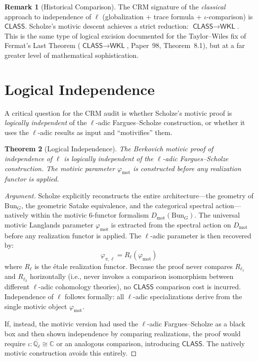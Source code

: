 \documentclass[11pt,a4paper]{article}
\theoremstyle{plain}
\newtheorem{theorem}{Theorem}[section]
\theoremstyle{definition}
\newtheorem{remark}[theorem]{Remark}
\newcommand{\WKL}{\textsf{WKL}}
\newcommand{\CLASS}{\textsf{CLASS}}
\newcommand{\Dmot}{D_{\mathrm{mot}}}
\newcommand{\Bun}{\mathrm{Bun}}
\newcommand{\Q}{\mathbb{Q}}
\newcommand{\C}{\mathbb{C}}
\begin{document}
\begin{remark}[Historical Comparison]
The CRM signature of the \emph{classical} approach to independence of $\ell$ (globalization + trace formula + $\iota$-comparison) is $\CLASS$. Scholze's motivic descent achieves a strict reduction: $\CLASS \to \WKL$. This is the same type of logical excision documented for the Taylor--Wiles fix of Fermat's Last Theorem ($\CLASS \to \WKL$, Paper~98, Theorem~8.1), but at a far greater level of mathematical sophistication.
\end{remark}


\section{Logical Independence}\label{sec:independence}

A critical question for the CRM audit is whether Scholze's motivic proof is \emph{logically independent} of the $\ell$-adic Fargues--Scholze construction, or whether it uses the $\ell$-adic results as input and ``motivifies'' them.

\begin{theorem}[Logical Independence]\label{thm:logical-independence}
The Berkovich motivic proof of independence of $\ell$ is logically independent of the $\ell$-adic Fargues--Scholze construction. The motivic parameter $\varphi_{\mathrm{mot}}$ is constructed before any realization functor is applied.
\end{theorem}

\begin{proof}[Argument]
Scholze explicitly reconstructs the entire architecture---the geometry of $\Bun_G$, the geometric Satake equivalence, and the categorical spectral action---natively within the motivic 6-functor formalism $\Dmot(\Bun_G)$. The universal motivic Langlands parameter $\varphi_{\mathrm{mot}}$ is extracted from the spectral action on $\Dmot$ before any realization functor is applied. The $\ell$-adic parameter is then recovered by:
\[
\varphi_{\pi, \ell} = R_\ell(\varphi_{\mathrm{mot}})
\]
where $R_\ell$ is the \'etale realization functor. Because the proof never compares $R_{\ell_1}$ and $R_{\ell_2}$ horizontally (i.e., never invokes a comparison isomorphism between different $\ell$-adic cohomology theories), no $\CLASS$ comparison cost is incurred. Independence of $\ell$ follows formally: all $\ell$-adic specializations derive from the single motivic object $\varphi_{\mathrm{mot}}$.

If, instead, the motivic version had used the $\ell$-adic Fargues--Scholze as a black box and then shown independence by comparing realizations, the proof would require $\iota: \overline{\Q_\ell} \cong \C$ or an analogous comparison, introducing $\CLASS$. The natively motivic construction avoids this entirely.
\end{proof}
\end{document}
